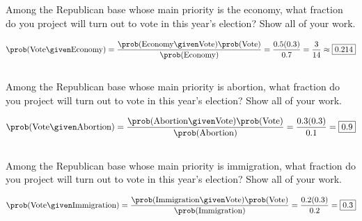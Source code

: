 \documentclass[newpages]{assignment}
\begin{document}
\subsection{}
\begin{problem}
    Among the Republican base whose main priority is the economy, what fraction do you project will turn out to vote in this year's election? Show all of your work.
\end{problem}
\begin{solution}
    \[
        \prob(\text{Vote}\given\text{Economy})
        = \frac{\prob(\text{Economy}\given\text{Vote})\prob(\text{Vote})}
        {\prob(\text{Economy})}
        = \frac{0.5(0.3)}{0.7}
        = \frac{3}{14}
        \approx \boxed{0.214}
    \]
\end{solution}

\subsection{}
\begin{problem}
    Among the Republican base whose main priority is abortion, what fraction do you project will turn out to vote in this year's election? Show all of your work.
\end{problem}
\begin{solution}
    \[
        \prob(\text{Vote}\given\text{Abortion})
        = \frac{\prob(\text{Abortion}\given\text{Vote})\prob(\text{Vote})}
        {\prob(\text{Abortion})}
        = \frac{0.3(0.3)}{0.1}
        = \boxed{0.9}
    \]
\end{solution}

\subsection{}
\begin{problem}
    Among the Republican base whose main priority is immigration, what fraction do you project will turn out to vote in this year's election? Show all of your work.
\end{problem}
\begin{solution}
    \[
        \prob(\text{Vote}\given\text{Immigration})
        = \frac{\prob(\text{Immigration}\given\text{Vote})\prob(\text{Vote})}
        {\prob(\text{Immigration})}
        = \frac{0.2(0.3)}{0.2}
        = \boxed{0.3}
    \]
\end{solution}
\end{document}

